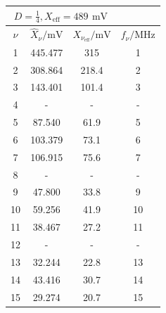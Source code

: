 \documentclass[a4paper, 12pt]{article}
\begin{document}
\begin{center}
\begin{tabular}{@{}cccc@{}}
          \toprule
          \multicolumn{3}{c}{$D = \frac{1}{4}, X_{\text{eff}}=489 \,\ \si{\milli\volt}$} \\ \midrule
          $\nu$      & $\hat{X}_\nu / \si{\milli\volt}$   & $X_{\nu_{\text{eff}}} / \si{\milli\volt}$ & $f_\nu / \si{\mega\hertz}$ \\ \hline
            1  & 445.477     & 315        & 1        \\
            2  & 308.864     & 218.4      & 2        \\
            3  & 143.401     & 101.4      & 3        \\
            4  & -           & -          & -        \\
            5  & 87.540      & 61.9       & 5        \\
            6  & 103.379     & 73.1       & 6        \\
            7  & 106.915     & 75.6       & 7        \\
            8  & -           & -          & -        \\
            9  & 47.800      & 33.8       & 9        \\
            10 & 59.256      & 41.9       & 10       \\
            11 & 38.467      & 27.2       & 11       \\
            12 & -           & -          & -        \\
            13 & 32.244      & 22.8       & 13       \\
            14 & 43.416      & 30.7       & 14       \\
            15 & 29.274      & 20.7       & 15       \\ \bottomrule
          \end{tabular}
          \egroup


\end{center}
\end{document}
